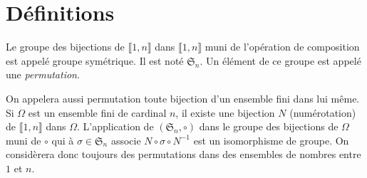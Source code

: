 

\section{Définitions}
\begin{defi}
 Le groupe des bijections de $\llbracket 1,n \rrbracket$ dans $\llbracket 1,n \rrbracket$ muni de l'opération de composition est appelé groupe symétrique. Il est noté $\mathfrak S_n$. Un élément de ce groupe est appelé une \emph{permutation}.
\end{defi}
On appelera aussi permutation toute bijection d'un ensemble fini dans lui même. Si $\Omega$ est un ensemble fini de cardinal $n$, il existe une bijection $N$ (numérotation) de $\llbracket 1,n \rrbracket$ dans $\Omega$. L'application de $(\mathfrak S_n,\circ)$ dans le groupe des bijections de $\Omega$ muni de $\circ$ qui à $\sigma\in \mathfrak{S}_n$ associe $N\circ \sigma \circ N^{-1}$ est un isomorphisme de groupe.\newline
On considèrera donc toujours des permutations dans des ensembles de nombres entre $1$ et $n$.

